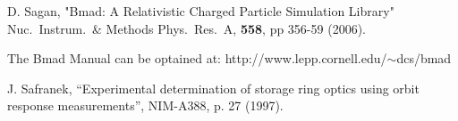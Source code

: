 \begin{thebibliography}{99}

D. Sagan,
"Bmad: A Relativistic Charged Particle Simulation Library"
Nuc.\ Instrum.\ \& Methods Phys.\ Res.\ A, {\bf 558}, pp 356-59 (2006).

The Bmad Manual can be optained at:\hfill\break
\hspace*{20pt} http://www.lepp.cornell.edu/$\scriptstyle\sim$dcs/bmad

J. Safranek, ``Experimental determination of storage ring optics
using orbit response measurements'', NIM-A388, p. 27 (1997).

\end{thebibliography}
